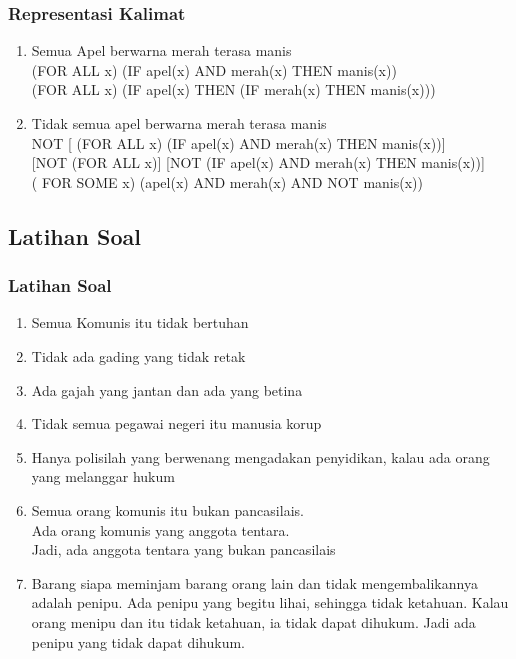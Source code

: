 \documentclass[handout]{beamer}
\theoremstyle{definition}
\theoremstyle{example}
\begin{document}
\begin{frame}
	\frametitle{Representasi Kalimat}
	 \begin{enumerate}       
        \item {\color{red}Semua} Apel berwarna merah terasa manis\\
        ({\color{red}FOR ALL x}) (IF apel(x) AND merah(x) THEN manis(x))\\
        ({\color{red}FOR ALL x}) (IF apel(x) THEN (IF merah(x) THEN manis(x)))
        \item {\color{red}Tidak semua} apel berwarna merah terasa manis\\
        NOT {[} ({\color{red}FOR ALL x}) (IF apel(x) AND merah(x) THEN manis(x)){]} \\
        {[}NOT ({\color{red}FOR ALL x}){]} {[}NOT (IF apel(x) AND merah(x) THEN manis(x)){]}\\
        ({\color{red} FOR SOME x}) (apel(x) AND merah(x) AND NOT manis(x))
    \end{enumerate}      
\end{frame}

\subsection{Latihan Soal}
\begin{frame}
    \frametitle{Latihan Soal}
    \begin{enumerate}       
    	\item {\color{red} Semua} Komunis itu tidak bertuhan
    	\item Tidak {\color{red}ada} gading yang tidak retak
    	\item {\color{red}Ada} gajah yang jantan dan {\color{red}ada} yang betina
    	\item {\color{red}Tidak semua} pegawai negeri itu manusia korup
    	\item {\color{red}Hanya polisilah} yang berwenang mengadakan penyidikan, kalau {\color{red}ada} orang yang melanggar hukum
    	\item {\color{red}Semua} orang komunis itu bukan pancasilais.\\
              {\color{red}Ada} orang komunis yang anggota tentara.\\
              Jadi, {\color{red}ada} anggota tentara yang bukan pancasilais
    	\item {\color{red}Barang siapa} meminjam barang orang lain dan tidak mengembalikannya adalah penipu. {\color{red}Ada} penipu yang begitu lihai, sehingga tidak ketahuan.
        Kalau {\color{red}orang} menipu dan itu tidak ketahuan, ia tidak dapat dihukum.
        Jadi {\color{red}ada} penipu yang tidak dapat dihukum. 
   \end{enumerate}     	
\end{frame}	
\end{document}
